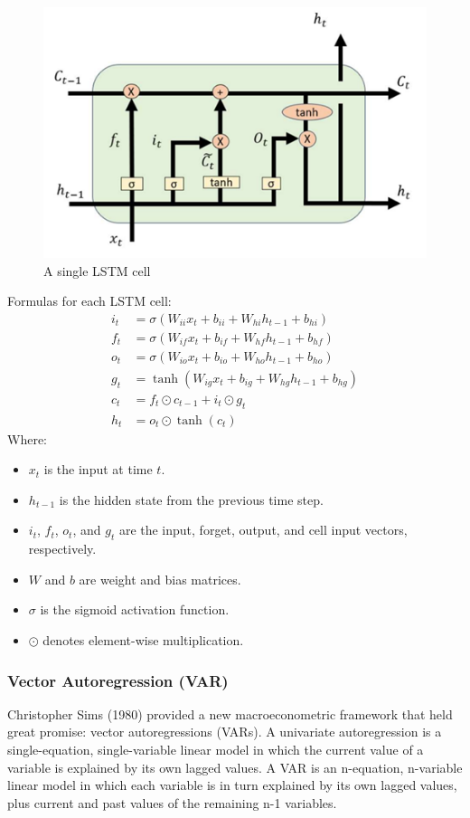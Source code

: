 \documentclass{ieeeojies}
\begin{document}
\begin{figure}[h!]
    \centering
    \includegraphics[width=0.75\linewidth]{LSTM_cell.png}
    \caption{A single LSTM cell}
    \label{fig:enter-label}
\end{figure}

Formulas for each LSTM cell:
\begin{align*}
i_t &= \sigma(W_{ii}x_t + b_{ii} + W_{hi}h_{t-1} + b_{hi}) \\
f_t &= \sigma(W_{if}x_t + b_{if} + W_{hf}h_{t-1} + b_{hf}) \\
o_t &= \sigma(W_{io}x_t + b_{io} + W_{ho}h_{t-1} + b_{ho}) \\
g_t &= \tanh(W_{ig}x_t + b_{ig} + W_{hg}h_{t-1} + b_{hg}) \\
c_t &= f_t \odot c_{t-1} + i_t \odot g_t \\
h_t &= o_t \odot \tanh(c_t)
\end{align*}
Where:
\begin{itemize}
    \item \(x_t\) is the input at time \(t\).
    \item \(h_{t-1}\) is the hidden state from the previous time step.
    \item \(i_t\), \(f_t\), \(o_t\), and \(g_t\) are the input, forget, output, and cell input vectors, respectively.
    \item \(W\) and \(b\) are weight and bias matrices.
    \item \(\sigma\) is the sigmoid activation function.
    \item \(\odot\) denotes element-wise multiplication.
\end{itemize}

\subsubsection{\textbf{Vector Autoregression (VAR)}}
\hspace{1em}Christopher Sims (1980) provided a new macroeconometric framework that held great promise: vector autoregressions (VARs). A univariate autoregression is a single-equation, single-variable linear model in which the current value of a variable is explained by its own lagged values. A VAR is an n-equation, n-variable linear model in which each variable is in turn explained by its own lagged values, plus current and past values of the remaining n-1 variables.
\end{document}
